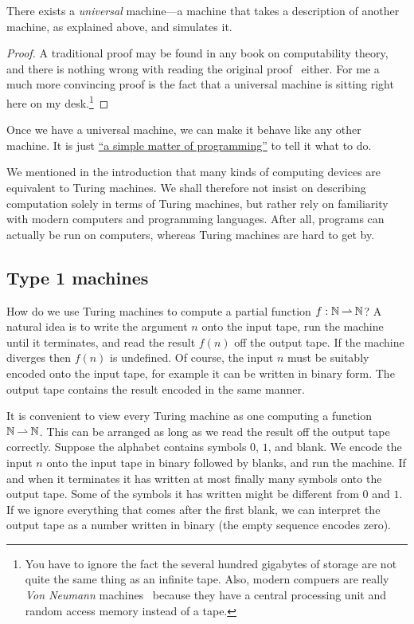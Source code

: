 \begin{theorem}[Turing]
  \label{thm:universal-machine}
  There exists a \emph{universal} machine---a machine that takes a
  description of another machine, as explained above, and simulates
  it.
\end{theorem}

\begin{proof}
  A traditional proof may be found in any book on computability
  theory, and there is nothing wrong with reading the original
  proof~\cite{turing37:_comput_number_with_applic_to_entsc} either.
  For me a much more convincing proof is the fact that a universal
  machine is sitting right here on my desk.\footnote{You have to
    ignore the fact the several hundred gigabytes of storage are not
    quite the same thing as an infinite tape. Also, modern compuers
    are really \emph{Von Neumann}
    machines~\cite{goldstein47:_repor_mathem_and_logic_aspec} because
    they have a central processing unit and random access memory
    instead of a tape.}
\end{proof}

Once we have a universal machine, we can make it behave like any other
machine. It is just
\href{http://www.catb.org/jargon/html/S/SMOP.html}{``a simple matter
  of programming''} to tell it what to do.

We mentioned in the introduction that many kinds of computing devices
are equivalent to Turing machines. We shall therefore not insist on
describing computation solely in terms of Turing machines, but rather
rely on familiarity with modern computers and programming languages.
After all, programs can actually be run on computers, whereas Turing
machines are hard to get by.


\subsection{Type 1 machines}
\label{sec:type-1}

How do we use Turing machines to compute a partial function $f :
\mathbb{N} \mathbin{\rightharpoonup} \mathbb{N}$? A natural idea is to write the argument $n$ onto the
input tape, run the machine until it terminates, and read the result
$f(n)$ off the output tape. If the machine diverges then $f(n)$ is
undefined. Of course, the input $n$ must be suitably encoded onto the
input tape, for example it can be written in binary form. The output
tape contains the result encoded in the same manner.

It is convenient to view every Turing machine as one computing a
function $\mathbb{N} \mathbin{\rightharpoonup} \mathbb{N}$. This can be arranged as long as we read the
result off the output tape correctly. Suppose the alphabet contains
symbols $0$, $1$, and blank. We encode the input $n$ onto the input
tape in binary followed by blanks, and run the machine. If and when it
terminates it has written at most finally many symbols onto the output
tape. Some of the symbols it has written might be different from $0$
and $1$. If we ignore everything that comes after the first blank, we
can interpret the output tape as a number written in binary (the empty
sequence encodes zero).

